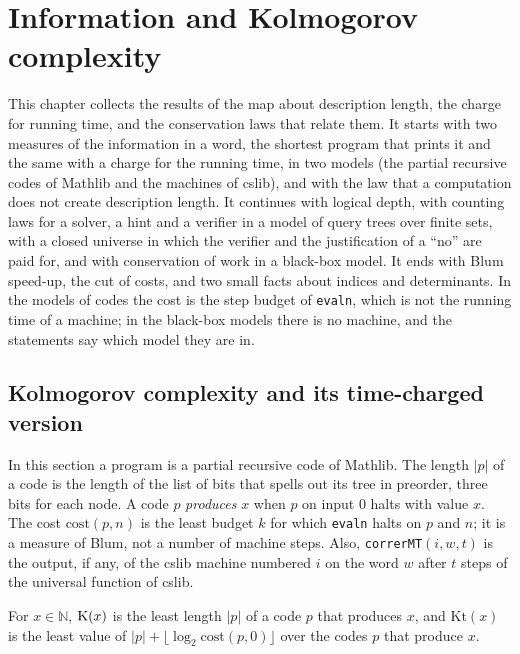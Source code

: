 \chapter{Information and Kolmogorov complexity}
\label{chap:information}

This chapter collects the results of the map about description length, the charge for running
time, and the conservation laws that relate them. It starts with two measures of the information in
a word, the shortest program that prints it and the same with a charge for the running time, in
two models (the partial recursive codes of Mathlib and the machines of cslib), and with the law
that a computation does not create description length. It continues with logical depth, with
counting laws for a solver, a hint and a verifier in a model of query trees over finite sets, with
a closed universe in which the verifier and the justification of a ``no'' are paid for, and with
conservation of work in a black-box model. It ends with Blum speed-up, the cut of costs, and two
small facts about indices and determinants. In the models of codes the cost is the step budget of
\texttt{evaln}, which is not the running time of a machine; in the black-box models there is no
machine, and the statements say which model they are in.

\section{Kolmogorov complexity and its time-charged version}
\label{sec:information-kolmogorov}

In this section a program is a partial recursive code of Mathlib. The length $|p|$ of a code is the
length of the list of bits that spells out its tree in preorder, three bits for each node. A code
$p$ \emph{produces} $x$ when $p$ on input $0$ halts with value $x$. The cost $\mathrm{cost}(p, n)$ is
the least budget $k$ for which \texttt{evaln} halts on $p$ and $n$; it is a measure of Blum, not a
number of machine steps. Also, \texttt{correrMT}$(i, w, t)$ is the output, if any, of the cslib
machine numbered $i$ on the word $w$ after $t$ steps of the universal function of cslib.

\begin{definition}
  \label{def:information-k-kt}
  \leanok
  For $x \in \mathbb{N}$, $\mathrm{K}(x)$ is the least length $|p|$ of a code $p$ that produces $x$, and
  $\mathrm{Kt}(x)$ is the least value of $|p| + \lfloor \log_2 \mathrm{cost}(p, 0) \rfloor$ over the
  codes $p$ that produce $x$.
\end{definition}

